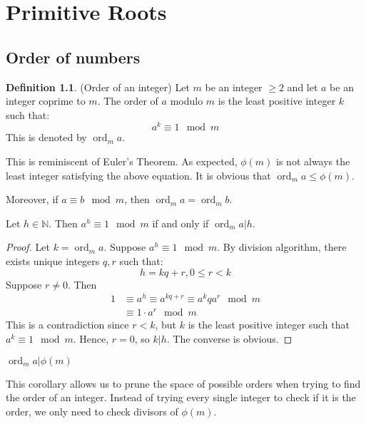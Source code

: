 \documentclass[12pt,letterpaper]{book}
\theoremstyle{definition}
\newtheorem{definition}{Definition} %
\newcommand{\N}{\mathbb{N}}
\DeclareMathOperator{\ord}{ord}
\begin{document}
\chapter{Primitive Roots}

\section{Order of numbers}

\begin{definition} (Order of an integer)
  Let $m$ be an integer $\geq 2$ and let $a$ be an integer coprime to $m$. The order of $a$ modulo $m$  is the least positive integer $k$ such that:
  \[a^k \equiv 1 \mod m\]
  This is denoted by $\ord_m a$.
\end{definition}

This is reminiscent of Euler's Theorem. As expected, $\phi(m)$ is not always the least integer satisfying the above equation. It is obvious that $\ord_m a \leq \phi(m)$.

Moreover, if $a \equiv b \mod m$, then $\ord_m a = \ord_m b$.

\begin{lemma}
  Let $h \in \N$. Then $a^h \equiv 1 \mod m$ if and only if $\ord_m a | h$. 
\end{lemma}
\begin{proof}
  Let $k = \ord_m a$. Suppose $a^h \equiv 1 \mod m$. By division algorithm, there exists unique integers $q,r$ such that:
  \[h = kq+r, 0 \leq r < k\]
  Suppose $r \neq 0$. Then
  \begin{align*}
     1 &\equiv a^h \equiv a^{kq+r} \equiv a^kq a^r \mod m \\
       &\equiv 1 \cdot a^r \mod m
  \end{align*}
  This is a contradiction since $r < k$, but $k$ is the least positive integer such that $a^k \equiv 1 \mod m$. Hence, $r = 0$, so $k|h$. The converse is obvious.
\end{proof}

\begin{corollary}
  $\ord_m a | \phi(m)$ 
\end{corollary}

This corollary allows us to prune the space of possible orders when trying to find the order of an integer. Instead of trying every single integer to check if it is the order, we only need to check divisors of $\phi(m)$.
\end{document}

